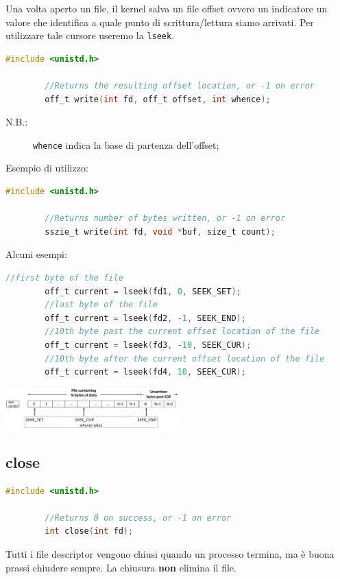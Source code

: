\documentclass[a4paper, 12pt]{book}
\begin{document}
    Una volta aperto un file, il kernel salva un file offset
    ovvero un indicatore un valore che identifica a quale punto 
    di scrittura/lettura siamo arrivati. Per utilizzare tale 
    cursore useremo la \verb|lseek|.
    \begin{lstlisting}[language=C]
        #include <unistd.h>

        //Returns the resulting offset location, or -1 on error
        off_t write(int fd, off_t offset, int whence);
    \end{lstlisting}
    \begin{description}
        \item[N.B.:] \verb|whence| indica la base di partenza dell'offset; 
    \end{description}
    Esempio di utilizzo:
    \begin{lstlisting}[language=C]
        #include <unistd.h>

        //Returns number of bytes written, or -1 on error
        sszie_t write(int fd, void *buf, size_t count);
    \end{lstlisting}
    Alcuni esempi:
    \begin{lstlisting}[language=C]
        //first byte of the file
        off_t current = lseek(fd1, 0, SEEK_SET);
        //last byte of the file
        off_t current = lseek(fd2, -1, SEEK_END);
        //10th byte past the current offset location of the file
        off_t current = lseek(fd3, -10, SEEK_CUR);
        //10th byte after the current offset location of the file
        off_t current = lseek(fd4, 10, SEEK_CUR);
    \end{lstlisting}
    \begin{center}
        \includegraphics[width=0.5\textwidth]{lseek.png}
    \end{center}

    \subsection{close}

    \begin{lstlisting}[language=C]
        #include <unistd.h>

        //Returns 0 on success, or -1 on error
        int close(int fd);
    \end{lstlisting}
    Tutti i file descriptor vengono chiusi quando un processo 
    termina, ma è buona prassi chiudere sempre. La chiusura 
    \textbf{non} elimina il file. 
\end{document}
